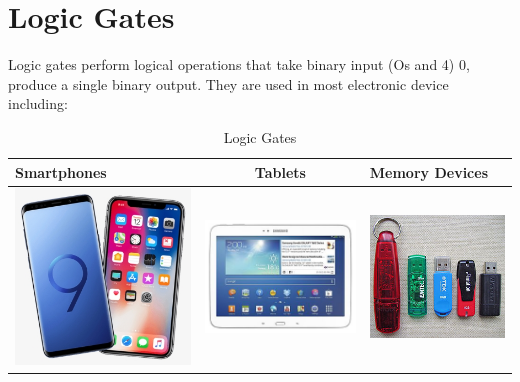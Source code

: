 \documentclass{article}
\begin{document}
 
	\section{Logic Gates} Logic gates perform logical operations that take binary input (Os and 4) 0, produce a single binary output. They are used in most electronic device including: 
	\begin{table}[h!] 
		\begin{center} 
			\caption{Logic Gates} \label{tab:tablel} 
			\begin{tabular}{l|c|l} 
			\hline 
			Smartphones & Tablets & Memory Devices\\ 
			\hline 
			\includegraphics[width=0.18\linewidth]{smartphone}
			& 
			\includegraphics[width=0.2\linewidth]{tablets}
			&
			\includegraphics[width=0.2\linewidth]{flashdrive}\\ 
			\hline 
			\end{tabular}
 		\end{center} 
	\end{table} 
\end{document}
